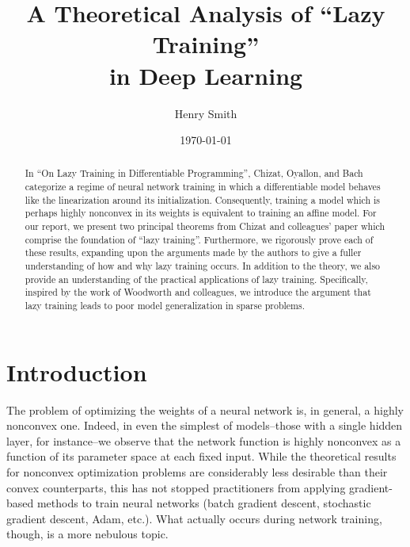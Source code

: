 \documentclass{article}
\title{\textbf{A Theoretical Analysis of \enquote{Lazy Training}\\ in Deep Learning}}
\author[]{Henry Smith}
\affil[]{\normalsize Yale University}
\date{\today}
\begin{document}
\maketitle

\begin{abstract}
    \noindent 
    In \enquote{On Lazy Training in Differentiable Programming},  Chizat, Oyallon, and Bach categorize a regime of neural network training in which a differentiable model behaves like the linearization around its initialization. Consequently, training a model which is perhaps highly nonconvex in its weights is equivalent to training an affine model. For our report, we present two principal theorems from Chizat and colleagues' paper which comprise the foundation of \enquote{lazy training}. Furthermore, we rigorously prove each of these results, expanding upon the arguments made by the authors to give a fuller understanding of how and why lazy training occurs. In addition to the theory, we also provide an understanding of the practical applications of lazy training. Specifically, inspired by the work of Woodworth and colleagues, we introduce the argument that lazy training leads to poor model generalization in sparse problems.
    \end{abstract}

\pagebreak

\section{Introduction}\label{introduction}

The problem of optimizing the weights of a neural network is, in general, a highly nonconvex one. Indeed, in even the simplest of models--those with a single hidden layer, for instance--we observe that the network function is highly nonconvex as a function of its parameter space at each fixed input. While the theoretical results for nonconvex optimization problems are considerably less desirable than their convex counterparts, this has not stopped practitioners from applying gradient-based methods to train neural networks (batch gradient descent, stochastic gradient descent, Adam, etc.). What actually occurs during network training, though, is a more nebulous topic. 
\end{document}
